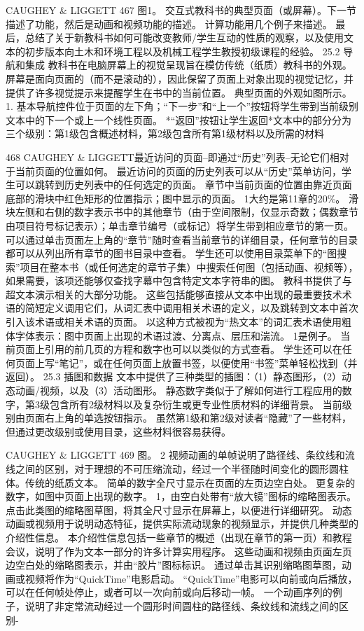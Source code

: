 \documentclass[UTF8,11pt,a4paper,openany,fontset=fandol]{ctexbook}
\begin{document}
CAUGHEY \& LIGGETT 467 图1。 交互式教科书的典型页面（或屏幕）。下一节描述了功能，然后是动画和视频功能的描述。 计算功能用几个例子来描述。 最后，总结了关于新教科书如何可能改变教师/学生互动的性质的观察，以及使用文本的初步版本向土木和环境工程以及机械工程学生教授初级课程的经验。 25.2 导航和集成 教科书在电脑屏幕上的视觉呈现旨在模仿传统（纸质）教科书的外观。 屏幕是面向页面的（而不是滚动的），因此保留了页面上对象出现的视觉记忆，并提供了许多视觉提示来提醒学生在书中的当前位置。 典型页面的外观如图所示。 1. 基本导航控件位于页面的左下角；“下一步”和“上一个”按钮将学生带到当前级别文本中的下一个或上一个线性页面。 *“返回”按钮让学生返回*文本中的部分分为三个级别：第1级包含概述材料，第2级包含所有第1级材料以及所需的材料

468 CAUGHEY \& LIGGETT最近访问的页面--即通过“历史”列表--无论它们相对于当前页面的位置如何。 最近访问的页面的历史列表可以从“历史”菜单访问，学生可以跳转到历史列表中的任何选定的页面。 章节中当前页面的位置由靠近页面底部的滑块中红色矩形的位置指示；图中显示的页面。 1大约是第11章的20\%。 滑块左侧和右侧的数字表示书中的其他章节（由于空间限制，仅显示奇数；偶数章节由项目符号标记表示）；单击章节编号（或标记）将学生带到相应章节的第一页。 可以通过单击页面左上角的“章节”随时查看当前章节的详细目录，任何章节的目录都可以从列出所有章节的图书目录中查看。 学生还可以使用目录菜单下的“图搜索”项目在整本书（或任何选定的章节子集）中搜索任何图（包括动画、视频等），如果需要，该项还能够仅查找字幕中包含特定文本字符串的图。 教科书提供了与超文本演示相关的大部分功能。 这些包括能够直接从文本中出现的最重要技术术语的简短定义调用它们，从词汇表中调用相关术语的定义，以及跳转到文本中首次引入该术语或相关术语的页面。 以这种方式被视为“热文本”的词汇表术语使用粗体字体表示：图中页面上出现的术语过渡、分离点、层压和湍流。 1是例子。 当前页面上引用的前几页的方程和数字也可以以类似的方式查看。 学生还可以在任何页面上写“笔记”，或在任何页面上放置书签，以便使用“书签”菜单轻松找到（并返回）。 25.3 插图和数据 文本中提供了三种类型的插图：（1）静态图形，（2）动态动画/视频，以及（3）活动图形。 静态数字类似于了解如何进行工程应用的数字，第3级包含所有2级材料以及复杂衍生或更专业性质材料的详细背景。 当前级别由页面右上角的单选按钮指示。 虽然第1级和第2级对读者“隐藏”了一些材料，但通过更改级别或使用目录，这些材料很容易获得。

CAUGHEY \& LIGGETT 469 图。 2 视频动画的单帧说明了路径线、条纹线和流线之间的区别，对于理想的不可压缩流动，经过一个半径随时间变化的圆形圆柱体。传统的纸质文本。 简单的数字全尺寸显示在页面的左页边空白处。 更复杂的数字，如图中页面上出现的数字。 1，由空白处带有“放大镜”图标的缩略图表示。 点击此类图的缩略图草图，将其全尺寸显示在屏幕上，以便进行详细研究。 动态动画或视频用于说明动态特征，提供实际流动现象的视频显示，并提供几种类型的介绍性信息。 本介绍性信息包括一些章节的概述（出现在章节的第一页）和教程会议，说明了作为文本一部分的许多计算实用程序。 这些动画和视频由页面左页边空白处的缩略图表示，并由“胶片”图标标识。 通过单击其识别缩略图草图，动画或视频将作为“QuickTime”电影启动。 “QuickTime”电影可以向前或向后播放，可以在任何帧处停止，或者可以一次向前或向后移动一帧。 一个动画序列的例子，说明了非定常流动经过一个圆形时间圆柱的路径线、条纹线和流线之间的区别-
\end{document}
